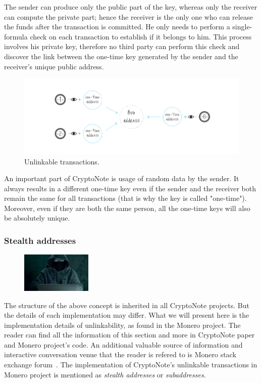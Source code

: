 The sender can produce only the public part of the key, whereas only the receiver can compute the private part; hence the receiver is the only one who can release the funds after the transaction is committed. He only needs to perform a single-formula check on each transaction to establish if it belongs to him. This process involves his private key, therefore no third party can perform this check and discover the link between the one-time key generated by the sender and the receiver's unique public address.
\begin{figure}[ht]
  \centering
  \includegraphics[width=0.9 \columnwidth,keepaspectratio]{Images/CryptoNote/unlinkable.png}
  \caption{Unlinkable transactions.~\cite{cryptonote}}
  \label{fig:unlinkable}
\end{figure}
\vspace{0.2cm}

An important part of CryptoNote is usage of random data by the sender. It always results in a different one-time key even if the sender and the receiver both remain the same for all transactions (that is why the key is called "one-time"). Moreover, even if they are both the same person, all the one-time keys will also be absolutely unique.

\subsubsection{Stealth addresses} \label{sec:stealth}
\begin{figure}
\centering
\includegraphics[width=0.30\textwidth]{Images/CryptoNote/stealth.jpg}
\end{figure}
The structure of the above concept is inherited in all CryptoNote projects. But the details of each implementation may differ. What we will present here is the implementation details of unlinkability, as found in the Monero project. The reader can find all the information of this section and more in CryptoNote paper~\cite{citeulike:14139412} and Monero project's code. An additional valuable source of information and interactive conversation venue that the reader is refered to is Monero stack exchange forum~\cite{stackexchange}. The implementation of CryptoNote's unlinkable transactions in Monero project is mentioned as \emph{stealth addresses} or \emph{subaddresses}.

